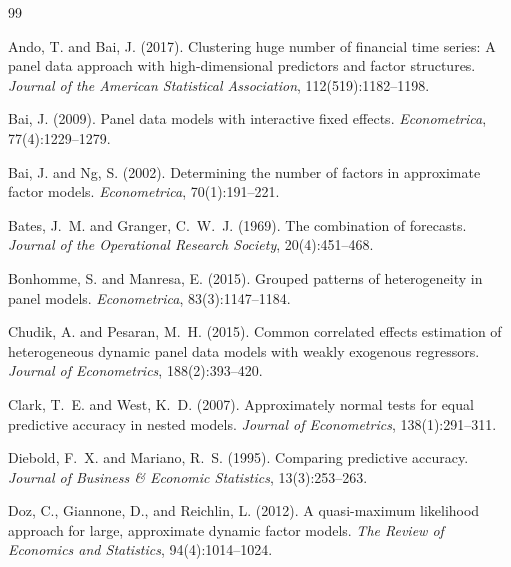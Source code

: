 \documentclass[11pt,a4paper]{article}
\begin{document}

\begin{thebibliography}{99}

Ando, T. and Bai, J. (2017).
\newblock Clustering huge number of financial time series: A panel data approach with high-dimensional predictors and factor structures.
\newblock \emph{Journal of the American Statistical Association}, 112(519):1182--1198.

Bai, J. (2009).
\newblock Panel data models with interactive fixed effects.
\newblock \emph{Econometrica}, 77(4):1229--1279.

Bai, J. and Ng, S. (2002).
\newblock Determining the number of factors in approximate factor models.
\newblock \emph{Econometrica}, 70(1):191--221.

Bates, J.~M. and Granger, C.~W.~J. (1969).
\newblock The combination of forecasts.
\newblock \emph{Journal of the Operational Research Society}, 20(4):451--468.

Bonhomme, S. and Manresa, E. (2015).
\newblock Grouped patterns of heterogeneity in panel models.
\newblock \emph{Econometrica}, 83(3):1147--1184.

Chudik, A. and Pesaran, M.~H. (2015).
\newblock Common correlated effects estimation of heterogeneous dynamic panel data models with weakly exogenous regressors.
\newblock \emph{Journal of Econometrics}, 188(2):393--420.

Clark, T.~E. and West, K.~D. (2007).
\newblock Approximately normal tests for equal predictive accuracy in nested models.
\newblock \emph{Journal of Econometrics}, 138(1):291--311.

Diebold, F.~X. and Mariano, R.~S. (1995).
\newblock Comparing predictive accuracy.
\newblock \emph{Journal of Business \& Economic Statistics}, 13(3):253--263.

Doz, C., Giannone, D., and Reichlin, L. (2012).
\newblock A quasi-maximum likelihood approach for large, approximate dynamic factor models.
\newblock \emph{The Review of Economics and Statistics}, 94(4):1014--1024.


\end{thebibliography}
\end{document}
